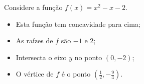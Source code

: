 \begin{exem}
 Considere a função $f(x)= x^2-x-2$.

 \begin{itemize}
    \item Esta função tem concavidade para cima;
    \item As raízes de $f$ são $-1$ e $2$;
    \item Intersecta o eixo $y$ no ponto $(0,-2)$;
    \item O vértice de $f$ é o ponto $(\frac{1}{2}, -\frac{9}{4})$.
\end{itemize}

\begin{center}
\end{center}
\end{exem}

